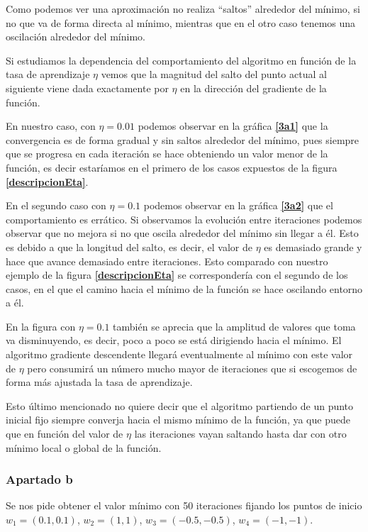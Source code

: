 \documentclass[12pt,a4paper]{article}
\begin{document}
Como podemos ver una aproximación no realiza ``saltos'' alrededor del mínimo, si no que va de forma directa al mínimo, mientras que en el otro caso tenemos una oscilación alrededor del mínimo. 

Si estudiamos la dependencia del comportamiento del algoritmo en función de la tasa de aprendizaje $\eta$ vemos que la magnitud del salto del punto actual al siguiente viene dada exactamente por $\eta$ en la dirección del gradiente de la función.

En nuestro caso, con $\eta = 0.01$ podemos observar en la gráfica \textbf{\ref{3a1}} que la convergencia es de forma gradual y sin saltos alrededor del mínimo, pues siempre que se progresa en cada iteración se hace obteniendo un valor menor de la función, es decir estaríamos en el primero de los casos expuestos de la figura \textbf{\ref{descripcionEta}}.

En el segundo caso con $\eta=0.1$ podemos observar en la gráfica \textbf{\ref{3a2}} que el comportamiento es errático. Si observamos la evolución entre iteraciones podemos observar que no mejora si no que oscila alrededor del mínimo sin llegar a él. Esto es debido a que la longitud del salto, es decir, el valor de $\eta$ es demasiado grande y hace que avance demasiado entre iteraciones. Esto comparado con nuestro ejemplo de la figura \textbf{\ref{descripcionEta}} se correspondería con el segundo de los casos, en el que el camino hacia el mínimo de la función se hace oscilando entorno a él.

En la figura con $\eta=0.1$ también se aprecia que la amplitud de valores que toma va disminuyendo, es decir, poco a poco se está dirigiendo hacia el mínimo. El algoritmo gradiente descendente llegará eventualmente al mínimo con este valor de $\eta$ pero consumirá un número mucho mayor de iteraciones que si escogemos de forma más ajustada la tasa de aprendizaje.

Esto último mencionado no quiere decir que el algoritmo partiendo de un punto inicial fijo siempre converja hacia el mismo mínimo de la función, ya que puede que en función del valor de $\eta$ las iteraciones vayan saltando hasta dar con otro mínimo local o global de la función.

\subsubsection{Apartado b}

Se nos pide obtener el valor mínimo con 50 iteraciones fijando los puntos de inicio $w_1 = (0.1,0.1)$, $w_2 = (1,1)$, $w_3 = (-0.5,-0.5)$, $w_4 = (-1,-1)$.
\end{document}
